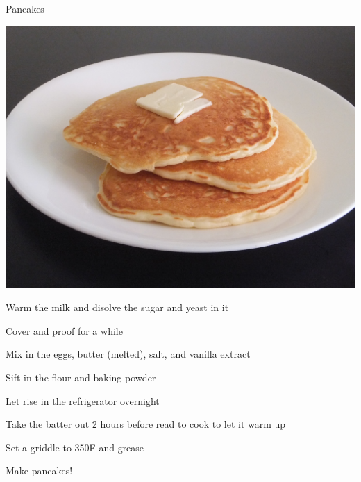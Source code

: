 \documentclass{recipe}
\begin{document}
\begin{recipe}{Pancakes}

  \begin{ingredients}
  \end{ingredients}

  \begin{images}
    \begin{image}
      \includegraphics[width=\linewidth,trim=0px 0px 0px 0px, clip=true]{pancakes-01.jpeg}
    \end{image}
  \end{images}

  \begin{steps}
  \item Warm the milk and disolve the sugar and yeast in it
  \item Cover and proof for a while
  \item Mix in the eggs, butter (melted), salt, and vanilla extract
  \item Sift in the flour and baking powder
  \item Let rise in the refrigerator overnight
  \item Take the batter out 2 hours before read to cook to let it warm
    up
  \item Set a griddle to 350\degree F and grease 
  \item Make pancakes!
  \end{steps}
\end{recipe}
\end{document}
